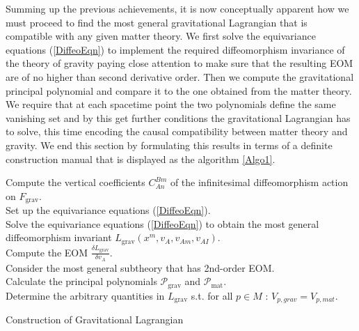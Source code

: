 Summing up the previous achievements, it is now conceptually apparent how we must proceed to find the most general gravitational Lagrangian that is compatible with any given matter theory. We first solve the equivariance equations (\ref{DiffeoEqn}) to implement the required diffeomorphism invariance of the theory of gravity paying close attention to make sure that the resulting EOM are of no higher than second derivative order. Then we compute the gravitational principal polynomial and compare it to the one obtained from the matter theory. We require that at each spacetime point the two polynomials define the same vanishing set and by this get further conditions the gravitational Lagrangian has to solve, this time encoding the causal compatibility between matter theory and gravity.
We end this section by formulating this results in terms of a definite construction manual that is displayed as the algorithm \ref{Algo1}.
\begin{algorithm}[hbt!]
\SetAlgoLined
{}
Compute the vertical coefficients $C^{Bm}_{An}$ of the infinitesimal diffeomorphism action on $F_{\text{grav}}$. \\
Set up the equivariance equations (\ref{DiffeoEqn}). \\
Solve the equivariance equations (\ref{DiffeoEqn}) to obtain the most general diffeomorphism invariant $L_{\text{grav}}(x^m,v_A,v_{Am},v_{AI})$.\\
Compute the EOM $\frac{\delta L_{\text{grav}}}{\delta v_A}$.\\
Consider the most general subtheory that has 2nd-order EOM.\\
Calculate the principal polynomials $\mathcal{P}_{\text{grav}}$ and $\mathcal{P}_{\text{mat}}$.\\
Determine the arbitrary quantities in $L_{\text{grav}}$ s.t. for all $p \in M$ : $V_{p,grav} = V_{p,mat}.$
 \caption{Construction of Gravitational Lagrangian}\label{Algo1}
\end{algorithm}

%
%
%


